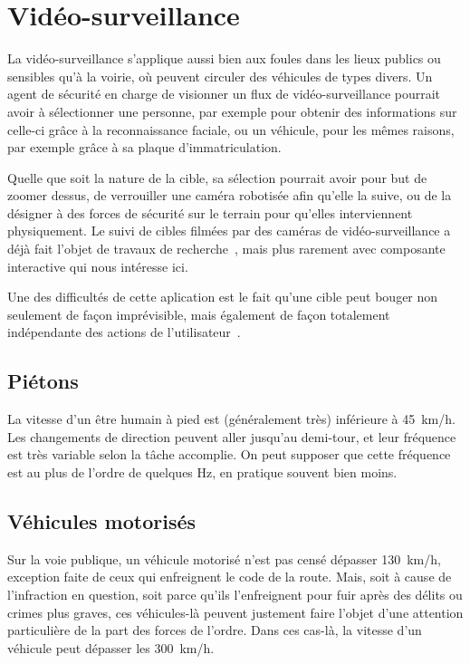 	
	
	\section{Vidéo-surveillance}
	La vidéo-surveillance s'applique aussi bien aux foules dans les lieux publics ou sensibles qu'à la voirie, où peuvent circuler des véhicules de types divers. Un agent de sécurité en charge de visionner un flux de vidéo-surveillance pourrait avoir à sélectionner une personne, par exemple pour obtenir des informations sur celle-ci grâce à la reconnaissance faciale, ou un véhicule, pour les mêmes raisons, par exemple grâce à sa plaque d'immatriculation.
	
	Quelle que soit la nature de la cible, sa sélection pourrait avoir pour but de zoomer dessus, de verrouiller une caméra robotisée afin qu'elle la suive, ou de la désigner à des forces de sécurité sur le terrain pour qu'elles interviennent physiquement. Le suivi de cibles filmées par des caméras de vidéo-surveillance a déjà fait l'objet de travaux de recherche~\cite{lipton1998moving, nishimura1997video, benfold2011stable}, mais plus rarement avec composante interactive qui nous intéresse ici.
	
	Une des difficultés de cette aplication est le fait qu'une cible peut bouger non seulement de façon imprévisible, mais également de façon totalement indépendante des actions de l'utilisateur~\cite{ilich2010moving, silva2012real}.	
	
	\subsection{Piétons}
	La vitesse d'un être humain à pied est (généralement très) inférieure à 45~km/h. Les changements de direction peuvent aller jusqu'au demi-tour, et leur fréquence est très variable selon la tâche accomplie. On peut supposer que cette fréquence est au plus de l'ordre de quelques Hz, en pratique souvent bien moins.

	\subsection{Véhicules motorisés}
	Sur la voie publique, un véhicule motorisé n'est pas censé dépasser 130~km/h, exception faite de ceux qui enfreignent le code de la route. Mais, soit à cause de l'infraction en question, soit parce qu'ils l'enfreignent pour fuir après des délits ou crimes plus graves, ces véhicules-là peuvent justement faire l'objet d'une attention particulière de la part des forces de l'ordre. Dans ces cas-là, la vitesse d'un véhicule peut dépasser les 300~km/h\footnotemark.
	
